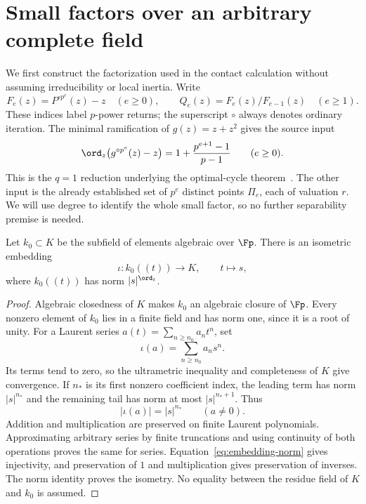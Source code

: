 \section{Small factors over an arbitrary complete field}
\label{sec:coefficients}

We first construct the factorization used in the contact calculation
without assuming irreducibility or local inertia. Write
\begin{equation}\label{eq:returns}
 F_e(z)=P^{\circ p^e}(z)-z\quad(e\ge0),\qquad
 Q_e(z)=F_e(z)/F_{e-1}(z)\quad(e\ge1).
\end{equation}
These indices label $p$-power returns; the superscript $\circ$ always
denotes ordinary iteration. The minimal ramification of $g(z)=z+z^2$
gives the source input
\begin{equation}\label{eq:minimal-ramification}
 \ord_z\bigl(g^{\circ p^e}(z)-z\bigr)
 =1+\frac{p^{e+1}-1}{p-1}\qquad(e\ge0).
\end{equation}
This is the $q=1$ reduction underlying the optimal-cycle
theorem~\cite[Theorem C and the $q=1$ discussion]{lindahl2016optimal}.
The other input is the already established set of $p^e$ distinct
points $\Pi_e$, each of valuation $r$. We will use degree to identify
the whole small factor, so no further separability premise is needed.

\begin{lemma}\label{lem:coefficient-field}
Let $k_0\subset K$ be the subfield of elements algebraic over $\Fp$.
There is an isometric embedding
\[
 \iota:k_0((t))\longrightarrow K,\qquad t\longmapsto s,
\]
where $k_0((t))$ has norm $|s|^{\ord_t}$.
\end{lemma}
\begin{proof}
Algebraic closedness of $K$ makes $k_0$ an algebraic closure of
$\Fp$. Every nonzero element of $k_0$ lies in a finite field and
has norm one, since it is a root of unity. For a Laurent series
$a(t)=\sum_{n\ge n_0}a_nt^n$, set
\[
 \iota(a)=\sum_{n\ge n_0}a_ns^n.
\]
Its terms tend to zero, so the ultrametric inequality and completeness
of $K$ give convergence. If $n_*$ is its first nonzero coefficient
index, the leading term has norm $|s|^{n_*}$ and the remaining tail
has norm at most $|s|^{n_*+1}$. Thus
\begin{equation}\label{eq:embedding-norm}
 |\iota(a)|=|s|^{n_*}\qquad(a\ne0).
\end{equation}
Addition and multiplication are preserved on finite Laurent
polynomials. Approximating arbitrary series by finite truncations
and using continuity of both operations proves the same for series.
Equation~\eqref{eq:embedding-norm} gives injectivity, and preservation
of $1$ and multiplication gives preservation of inverses. The norm
identity proves the isometry. No equality between the residue field
of $K$ and $k_0$ is assumed.
\end{proof}

